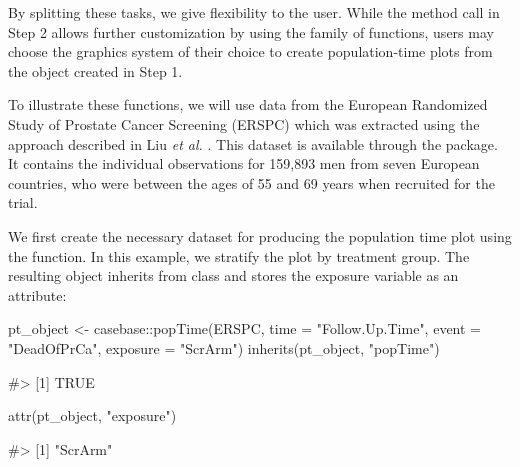 By splitting these tasks, we give flexibility to the user. While the
method call in Step 2 allows further customization by using the
 \citep{ggplot2} family of functions, users may choose
the graphics system of their choice to create population-time plots from
the object created in Step 1.

To illustrate these functions, we will use data from the European
Randomized Study of Prostate Cancer Screening (ERSPC)
\citep{schroder2009screening} which was extracted using the approach
described in Liu \emph{et al.} \citeyearpar{liu2014recovering}. This
dataset is available through the  package. It contains the
individual observations for 159,893 men from seven European countries,
who were between the ages of 55 and 69 years when recruited for the
trial.

We first create the necessary dataset for producing the population time
plot using the  function. In this example, we stratify the
plot by treatment group. The resulting object inherits from class
 and stores the exposure variable as an attribute:

\begin{Schunk}
\begin{Sinput}
pt_object <- casebase::popTime(ERSPC, time = "Follow.Up.Time",
                               event = "DeadOfPrCa", exposure = "ScrArm")
inherits(pt_object, "popTime")
\end{Sinput}
\begin{Soutput}
#> [1] TRUE
\end{Soutput}
\begin{Sinput}
attr(pt_object, "exposure")
\end{Sinput}
\begin{Soutput}
#> [1] "ScrArm"
\end{Soutput}
\end{Schunk}

